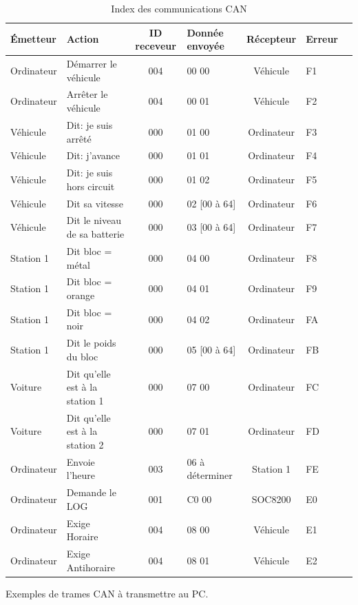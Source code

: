 \documentclass[10pt,a4paper,final]{article}
\begin{document}
\begin{spacing}{1.5}
\begin{table}[!ht]
\caption{Index des communications CAN}
\medskip
\centering
\begin{tabular}{|l|l|c|l|c|l|c|}
\hline 
\textbf{Émetteur} & \textbf{Action} & \textbf{ID receveur} & \textbf{Donnée envoyée} & \textbf{Récepteur} & \textbf{Erreur}\\ 
\hline 
Ordinateur & Démarrer le véhicule & 004 & 00 00  & Véhicule &  F1\\ 
\hline 
Ordinateur & Arrêter le véhicule & 004 & 00 01  & Véhicule &  F2\\ 
\hline 
Véhicule & Dit: je suis arrêté & 000 & 01 00   & Ordinateur &  F3\\
\hline 
Véhicule & Dit: j'avance & 000 & 01 01  & Ordinateur & F4\\  
\hline 
Véhicule & Dit: je suis hors circuit & 000 & 01 02  & Ordinateur &  F5\\ 
\hline 
Véhicule & Dit sa vitesse & 000 & 02 [00 à 64]  & Ordinateur &  F6\\ 
\hline 
Véhicule & Dit le niveau de sa batterie & 000 & 03 [00 à 64]  & Ordinateur &  F7\\ 
\hline 
Station 1 & Dit bloc = métal & 000 & 04 00  & Ordinateur &  F8\\ 
\hline  
Station 1 & Dit bloc = orange & 000 & 04 01  & Ordinateur &  F9\\
\hline 
Station 1 & Dit bloc = noir & 000 & 04 02  & Ordinateur &  FA\\
\hline 
Station 1 & Dit le poids du bloc & 000 & 05 [00 à 64]  & Ordinateur &  FB\\ 
\hline 
Voiture & Dit qu'elle est à la station 1 & 000 & 07 00  & Ordinateur &  FC\\ 
\hline 
Voiture & Dit qu'elle est à la station 2 & 000 & 07 01  & Ordinateur &  FD\\
\hline 
Ordinateur & Envoie l'heure & 003 & 06 à déterminer  & Station 1 &  FE\\ 
\hline 
Ordinateur & Demande le LOG & 001 & C0 00  & SOC8200 & E0\\ 
\hline
Ordinateur & Exige Horaire & 004 & 08 00  & Véhicule & E1\\ 
\hline
Ordinateur & Exige Antihoraire & 004 & 08 01  & Véhicule & E2\\ 
\hline
\end{tabular} 
\label{tab:testtab1}
\end{table}

\pagebreak
\begin{flushleft}
 Exemples de trames CAN à transmettre au PC.
 \end{flushleft} 
\end{spacing}
\end{document}
